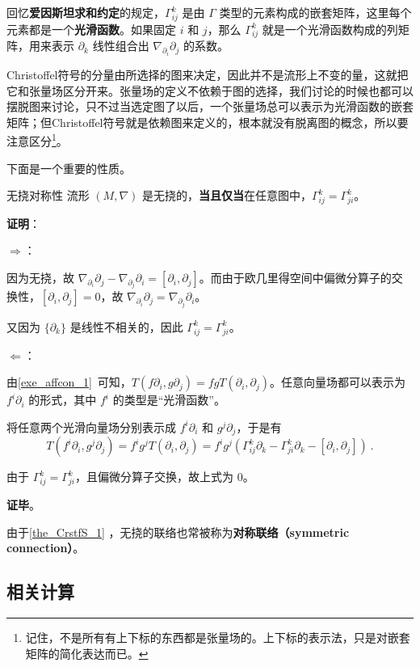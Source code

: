 回忆\textbf{爱因斯坦求和约定}的规定，$\Gamma^k_{ij}$ 是由 $\Gamma$ 类型的元素构成的嵌套矩阵，这里每个元素都是一个\textbf{光滑函数}。如果固定 $i$ 和 $j$，那么 $\Gamma^k_{ij}$ 就是一个光滑函数构成的列矩阵，用来表示 $\partial_k$ 线性组合出 $\nabla_{\partial_i}\partial_j$ 的系数。

Christoffel符号的分量由所选择的图来决定，因此并不是流形上不变的量，这就把它和张量场区分开来。张量场的定义不依赖于图的选择，我们讨论的时候也都可以摆脱图来讨论，只不过当选定图了以后，一个张量场总可以表示为光滑函数的嵌套矩阵；但Christoffel符号就是依赖图来定义的，根本就没有脱离图的概念，所以要注意区分\footnote{记住，不是所有有上下标的东西都是张量场的。上下标的表示法，只是对嵌套矩阵的简化表达而已。}。


下面是一个重要的性质。

\begin{theorem}{无挠对称性}\label{the_CrstfS_1}
流形 $(M, \nabla)$ 是无挠的，\textbf{当且仅当}在任意图中，$\Gamma^k_{ij}=\Gamma^k_{ji}$。
\end{theorem}

\textbf{证明}：

$\Rightarrow$：

因为无挠，故 $\nabla_{\partial_i}\partial_j-\nabla_{\partial_j}\partial_i=[\partial_i, \partial_j]$。而由于欧几里得空间中偏微分算子的交换性，$[\partial_i, \partial_j]=0$，故 $\nabla_{\partial_i}\partial_j=\nabla_{\partial_j}\partial_i$。

又因为 $\{\partial_k\}$ 是线性不相关的，因此 $\Gamma^k_{ij}=\Gamma^k_{ji}$。

$\Leftarrow$：

由\autoref{exe_affcon_1}~可知，$T(f\partial_i, g\partial_j)=fgT(\partial_i, \partial_j)$。任意向量场都可以表示为 $f^i\partial_i$ 的形式，其中 $f^i$ 的类型是“光滑函数”。

将任意两个光滑向量场分别表示成 $f^i\partial_i$ 和 $g^j\partial_j$，于是有
\begin{equation}
T(f^i\partial_i, g^j\partial_j)=f^ig^jT(\partial_i, \partial_j)=f^ig^j(\Gamma^k_{ij}\partial_k-\Gamma^k_{ji}\partial_k-[\partial_i, \partial_j])~.
\end{equation}

由于 $\Gamma^k_{ij}=\Gamma^k_{ji}$，且偏微分算子交换，故上式为 $0$。

\textbf{证毕}。

由于\autoref{the_CrstfS_1} ，无挠的联络也常被称为\textbf{对称联络（symmetric connection）}。


\subsection{相关计算}

